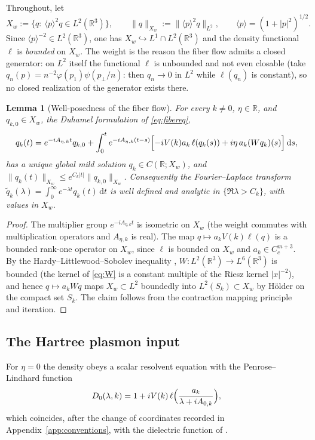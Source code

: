 \documentclass[11pt,a4paper]{amsart}
\newtheorem{lemma}[theorem]{Lemma}
\theoremstyle{definition}
\theoremstyle{remark}
\newcommand{\R}{\mathbb{R}}
\newcommand{\dd}{\,\mathrm{d}}
\newcommand{\ellf}{\ell}
\begin{document}
Throughout, let
\begin{equation}\label{eq:Xw}
X_w:=\bigl\{q:\ \langle p\rangle^{2}q\in L^2(\R^3)\bigr\},\qquad
\|q\|_{X_w}:=\|\langle p\rangle^{2}q\|_{L^2},\qquad \langle p\rangle=(1+|p|^2)^{1/2}.
\end{equation}
Since $\langle p\rangle^{-2}\in L^2(\R^3)$, one has $X_w\hookrightarrow L^1\cap L^2(\R^3)$ and the density functional $\ellf$ is \emph{bounded} on $X_w$. The weight is the reason the fiber flow admits a closed generator: on $L^2$ itself the functional $\ellf$ is unbounded and not even closable (take $q_n(p)=n^{-2}\varphi(p_1)\psi(p_\perp/n)$: then $q_n\to0$ in $L^2$ while $\ellf(q_n)$ is constant), so no closed realization of the generator exists there.

\begin{lemma}[Well-posedness of the fiber flow]\label{lem:wp}
For every $k\ne0$, $\eta\in\R$, and $q_{k,0}\in X_w$, the Duhamel formulation of \eqref{eq:fibereq},
\[
q_k(t)=e^{-iA_{\eta,k}t}q_{k,0}+\int_0^te^{-iA_{\eta,k}(t-s)}\Bigl[-iV(k)a_k\,\ellf(q_k(s))+i\eta\,a_k(Wq_k)(s)\Bigr]\dd s,
\]
has a unique global mild solution $q_k\in C(\R;X_w)$, and $\|q_k(t)\|_{X_w}\le e^{C_k|t|}\|q_{k,0}\|_{X_w}$. Consequently the Fourier--Laplace transform $\widetilde q_k(\lambda)=\int_0^\infty e^{-\lambda t}q_k(t)\dd t$ is well defined and analytic in $\{\Re\lambda>C_k\}$, with values in $X_w$.
\end{lemma}

\begin{proof}
The multiplier group $e^{-iA_{\eta,k}t}$ is isometric on $X_w$ (the weight commutes with multiplication operators and $A_{\eta,k}$ is real). The map $q\mapsto a_kV(k)\ellf(q)$ is a bounded rank-one operator on $X_w$, since $\ellf$ is bounded on $X_w$ and $a_k\in C_c^{m+3}$. By the Hardy--Littlewood--Sobolev inequality \cite{Stein}, $W:L^2(\R^3)\to L^6(\R^3)$ is bounded (the kernel of \eqref{eq:W} is a constant multiple of the Riesz kernel $|x|^{-2}$), and hence $q\mapsto a_kWq$ maps $X_w\subset L^2$ boundedly into $L^2(S_k)\subset X_w$ by H\"older on the compact set $S_k$. The claim follows from the contraction mapping principle and iteration.
\end{proof}

\subsection{The Hartree plasmon input}\label{sec:input}
For $\eta=0$ the density obeys a scalar resolvent equation with the Penrose--Lindhard function
\begin{equation}\label{eq:D0}
D_0(\lambda,k)=1+iV(k)\,\ellf\Bigl(\frac{a_k}{\lambda+iA_{0,k}}\Bigr),
\end{equation}
which coincides, after the change of coordinates recorded in Appendix~\ref{app:conventions}, with the dielectric function of \cite{NY1}.
\end{document}

